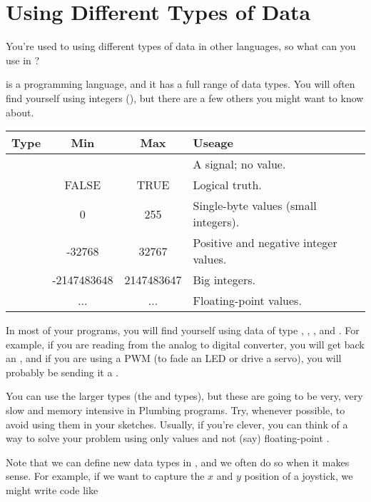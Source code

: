 \seealso

\XXX

% 

\section{Using Different Types of Data}

\problem
You're used to using different types of data in other languages, so what can you use in \occam?


\solution
\occam is a programming language, and it has a full range of data types. You will often find yourself using integers (\INT), but there are a few others you might want to know about.


	\begin{tabular}{l|c|c|p{1in}}
		\hline
		Type & Min & Max & Useage \\
		\hline
		\SIGNALT & & & A signal; no value. \\
		\BOOL & FALSE & TRUE & Logical truth. \\
		\BYTE & 0 & 255 & Single-byte values (small integers). \\
		\INT & -32768 & 32767 & Positive and negative integer values. \\
		\INTTT &  -2147483648 & 2147483647 & Big integers. \\
		\REALTT & ... & ... & Floating-point values. \\
		\hline
	\end{tabular}

\discussion
In most of your programs, you will find yourself using data of type \SIGNALT, \BOOL, \BYTE, and \INT. For example, if you are reading from the analog to digital converter, you will get back an \INT, and if you are using a PWM \PROC (to fade an LED or drive a servo), you will probably be sending it a \BYTE. 

You can use the larger types (the \INTTT and \REALTT types), but these are going to be very, very slow and memory intensive in Plumbing programs. Try, whenever possible, to avoid using them in your sketches. Usually, if you're clever, you can think of a way to solve your problem using only \INT values and not (say) floating-point \REALTT.

Note that we can define new data types in \occam, and we often do so when it makes sense. For example, if we want to capture the $x$ and $y$ position of a joystick, we might write code like

